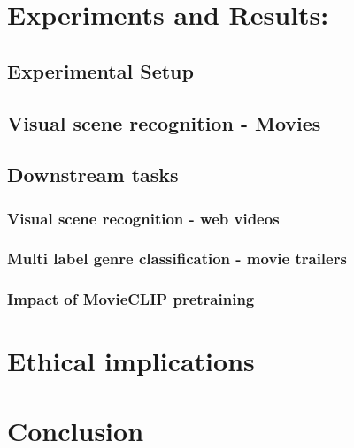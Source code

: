 \section{Experiments and Results:}
\subsection{Experimental Setup}
\subsection{Visual scene recognition - Movies}
\subsection{Downstream tasks}
\subsubsection{Visual scene recognition - web videos}
\subsubsection{Multi label genre classification - movie trailers}
\subsubsection{Impact of MovieCLIP pretraining}
\section{Ethical implications}
\section{Conclusion}
